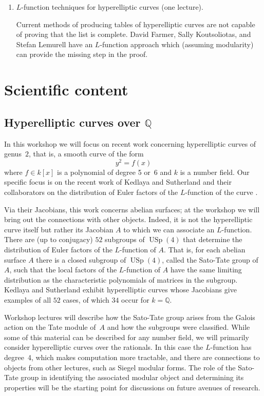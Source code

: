 \documentclass[12pt]{amsart}
\DeclareMathOperator{\USp}{USp}
\numberwithin{equation}{section}
\newcommand{\Q}{\mathbb Q}
\begin{document}
\begin{enumerate}

\item  $L$-function techniques for hyperelliptic curves (one lecture).

\noindent
Current methods of producing tables of hyperelliptic curves are not
capable of proving that the list is complete.  David Farmer, Sally
Koutsoliotas, and Stefan Lemurell have an $L$-function approach which
(assuming modularity) can provide the missing step in the proof.

\end{enumerate}

\section{Scientific content}

\subsection{Hyperelliptic curves over $\Q$}

In this workshop we will focus on recent work concerning hyperelliptic 
curves
of genus~$2$, that is, a smooth curve of the form
\begin{equation}
y^2=f(x)
\end{equation}
where $f\in k[x]$ is a polynomial of degree 5 or~6 and $k$ is a number
field.  Our specific focus is on the recent work of Kedlaya and
Sutherland and their collaborators on the distribution of Euler
factors of the $L$-function of the curve
\cite{KS-1,kedlaya-sutherland-ants}.

Via their Jacobians, this work concerns abelian surfaces; at the
workshop we will bring out the connections with other objects.
Indeed, it is not the hyperelliptic curve itself but rather its
Jacobian $A$ to which we can associate an $L$-function.  There are (up
to conjugacy) $52$ subgroups of $\USp(4)$ that determine the
distribution of Euler factors of the $L$-function of $A$.  That is,
for each abelian surface $A$ there is a closed subgroup of $\USp(4)$,
called the Sato-Tate group of $A$, such that the local factors of the
$L$-function of $A$ have the same limiting distribution as the
characteristic polynomials of matrices in the subgroup.  Kedlaya and
Sutherland exhibit hyperelliptic curves whose Jacobians give examples
of all $52$ cases, of which $34$ occur for $k=\Q$.

Workshop lectures will describe how the Sato-Tate group arises from
the Galois action on the Tate module of~$A$ and how the subgroups were
classified.  While some of this material can be described for any
number field, we will primarily consider hyperelliptic curves over the
rationals.  In this case the $L$-function has degree~4, which makes
computation more tractable, and there are connections to objects from
other lectures, such as Siegel modular forms.  The role of the
Sato-Tate group in identifying the associated modular object and
determining its properties will be the starting point for discussions
on future avenues of research.
\end{document}
